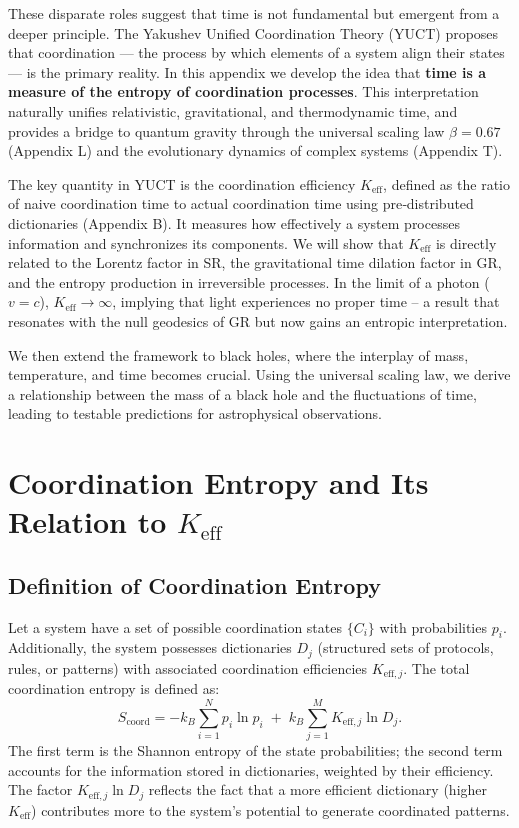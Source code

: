 \documentclass[12pt,a4paper]{article}
\newcommand{\Keff}{K_{\mathrm{eff}}}
\newcommand{\Keffi}[1]{K_{\mathrm{eff},#1}}   %
\newcommand{\Scoord}{S_{\mathrm{coord}}}
\begin{document}
	These disparate roles suggest that time is not fundamental but emergent from a deeper principle. The Yakushev Unified Coordination Theory (YUCT) proposes that coordination — the process by which elements of a system align their states — is the primary reality. In this appendix we develop the idea that \textbf{time is a measure of the entropy of coordination processes}. This interpretation naturally unifies relativistic, gravitational, and thermodynamic time, and provides a bridge to quantum gravity through the universal scaling law \(\beta = 0.67\) (Appendix L) and the evolutionary dynamics of complex systems (Appendix T).
	
	The key quantity in YUCT is the coordination efficiency \(\Keff\), defined as the ratio of naive coordination time to actual coordination time using pre‑distributed dictionaries (Appendix B). It measures how effectively a system processes information and synchronizes its components. We will show that \(\Keff\) is directly related to the Lorentz factor in SR, the gravitational time dilation factor in GR, and the entropy production in irreversible processes. In the limit of a photon (\(v=c\)), \(\Keff \to \infty\), implying that light experiences no proper time – a result that resonates with the null geodesics of GR but now gains an entropic interpretation.
	
	We then extend the framework to black holes, where the interplay of mass, temperature, and time becomes crucial. Using the universal scaling law, we derive a relationship between the mass of a black hole and the fluctuations of time, leading to testable predictions for astrophysical observations.
	
	\section{Coordination Entropy and Its Relation to \(\Keff\)}
	\label{sec:coord_entropy}
	
	\subsection{Definition of Coordination Entropy}
	
	Let a system have a set of possible coordination states \(\{C_i\}\) with probabilities \(p_i\). Additionally, the system possesses dictionaries \(D_j\) (structured sets of protocols, rules, or patterns) with associated coordination efficiencies \(\Keffi{j}\). The total coordination entropy is defined as:
	\begin{equation}
		\Scoord = -k_B \sum_{i=1}^{N} p_i \ln p_i \;+\; k_B \sum_{j=1}^{M} \Keffi{j} \ln D_j.
		\label{eq:coord_entropy_def}
	\end{equation}
	The first term is the Shannon entropy of the state probabilities; the second term accounts for the information stored in dictionaries, weighted by their efficiency. The factor \(\Keffi{j} \ln D_j\) reflects the fact that a more efficient dictionary (higher \(\Keff\)) contributes more to the system's potential to generate coordinated patterns.
	
\end{document}
